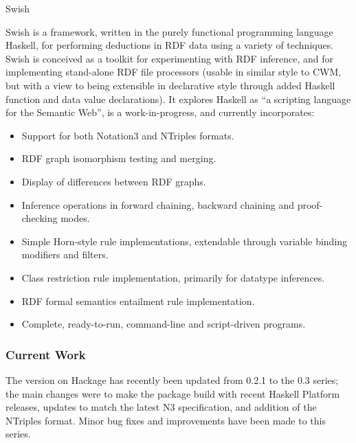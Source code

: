 \documentclass{scrreprt}
\begin{document}
\begin{hcarentry}{Swish}
\makeheader

Swish is a framework, written in the purely functional programming
language Haskell, for performing deductions in RDF data using a
variety of techniques. Swish is conceived as a toolkit for
experimenting with RDF inference, and for implementing stand-alone RDF
file processors (usable in similar style to CWM, but with a view to
being extensible in declarative style through added Haskell function
and data value declarations). It explores Haskell as ``a scripting
language for the Semantic Web'', is a work-in-progress, and currently
incorporates:

\begin{itemize}

\item
Support for both Notation3 and NTriples formats.

\item
RDF graph isomorphism testing and merging.

\item
Display of differences between RDF graphs.

\item
Inference operations in forward chaining, backward chaining and proof-checking modes.

\item
Simple Horn-style rule implementations, extendable through variable binding modifiers and filters.

\item
Class restriction rule implementation, primarily for datatype inferences.

\item
RDF formal semantics entailment rule implementation.

\item
Complete, ready-to-run, command-line and script-driven programs.

\end{itemize}

\subsubsection*{Current Work}

The version on Hackage has recently been updated from 0.2.1 to
the 0.3 series; the main changes were to make the package build
with recent Haskell Platform releases, updates to match the latest
N3 specification, and addition of the NTriples format. Minor bug fixes
and improvements have been made to this series.


\end{hcarentry}
\end{document}
